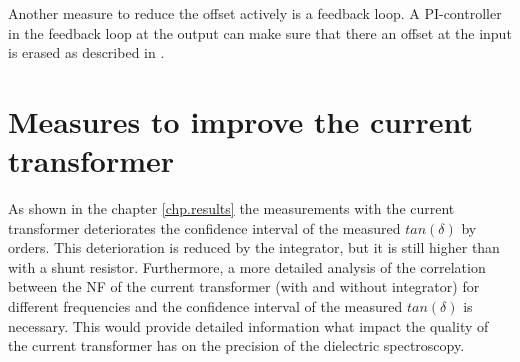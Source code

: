 Another measure to reduce the offset actively is a feedback loop. A PI-controller in the feedback loop at the output can make sure that there an offset at the input is erased as described in \cite{thomas}. 

\section{Measures to improve the current transformer}
As shown in the chapter \ref{chp.results} the measurements with the current transformer deteriorates the confidence interval of the measured $tan(\delta)$ by orders. This deterioration is reduced by the integrator, but it is still higher than with a shunt resistor. 
Furthermore, a more detailed analysis of the correlation between the NF of the current transformer (with and without integrator) for different frequencies and the confidence interval of the measured $tan(\delta)$ is necessary. This would provide detailed information what impact the quality of the current transformer has on the precision of the dielectric spectroscopy. 

